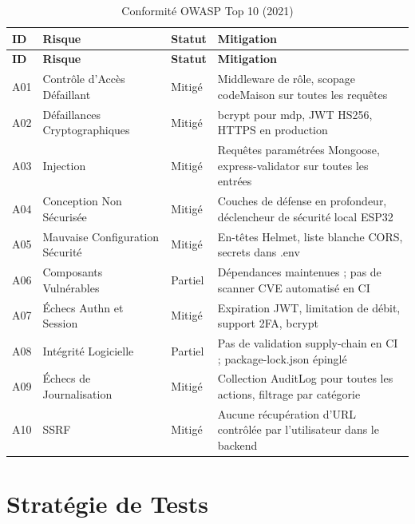 \begin{center}
\begin{longtable}{p{} p{} p{} p{}}
\caption{Conformité OWASP Top 10 (2021)}\label{tab:owasp}\\
\toprule
\textbf{ID} & \textbf{Risque} & \textbf{Statut} & \textbf{Mitigation} \\
\midrule
\endfirsthead
\toprule
\textbf{ID} & \textbf{Risque} & \textbf{Statut} & \textbf{Mitigation} \\
\midrule
\endhead
\bottomrule
\endfoot
A01 & Contrôle d'Accès Défaillant    & Mitigé   & Middleware de rôle, scopage codeMaison sur toutes les requêtes \\
A02 & Défaillances Cryptographiques   & Mitigé   & bcrypt pour mdp, JWT HS256, HTTPS en production \\
A03 & Injection                       & Mitigé   & Requêtes paramétrées Mongoose, express-validator sur toutes les entrées \\
A04 & Conception Non Sécurisée        & Mitigé   & Couches de défense en profondeur, déclencheur de sécurité local ESP32 \\
A05 & Mauvaise Configuration Sécurité & Mitigé   & En-têtes Helmet, liste blanche CORS, secrets dans .env \\
A06 & Composants Vulnérables          & Partiel  & Dépendances maintenues ; pas de scanner CVE automatisé en CI \\
A07 & Échecs Authn et Session         & Mitigé   & Expiration JWT, limitation de débit, support 2FA, bcrypt \\
A08 & Intégrité Logicielle            & Partiel  & Pas de validation supply-chain en CI ; package-lock.json épinglé \\
A09 & Échecs de Journalisation        & Mitigé   & Collection AuditLog pour toutes les actions, filtrage par catégorie \\
A10 & SSRF                            & Mitigé   & Aucune récupération d'URL contrôlée par l'utilisateur dans le backend \\
\end{longtable}
\end{center}

\section{Stratégie de Tests}


